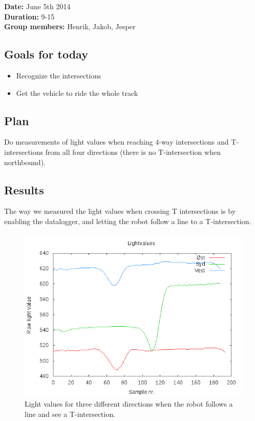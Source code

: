 \textbf{Date:} June 5th 2014\\\textbf{Duration:} 9-15\\\textbf{Group
members:} Henrik, Jakob, Jesper

\subsection{Goals for today}

\begin{itemize}
\itemsep1pt\parskip0pt
\item
  Recognize the intersections
\item
  Get the vehicle to ride the whole track
\end{itemize}

\subsection{Plan}

Do measurements of light values when reaching 4-way intersections and T-intersections from all four directions (there is no T-intersection when northbound).

\subsection{Results}

The way we measured the light values when crossing T intersections is by
enabling the datalogger, and letting the robot follow a line to a T-intersection.

\begin{figure}[h]
  \centering
  \includegraphics[scale=0.5]{../experiments/2prototype/results/gnuplot/retningsbaseret_3vejs.png}
  \caption{Light values for three different directions when the robot follows a line and see a T-intersection.}
\end{figure}

